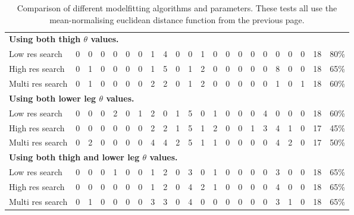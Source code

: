 \begin{landscape}
\begin{table}[p]
\begin{tabular}{|l|c@{ }c|c@{ }c|c@{ }c|c@{ }c|c@{ }c|c@{ }c|c@{ }c|c@{ }c|c@{ }c|c@{ }c|c|}
			\hline
			\multicolumn{22}{|l|}{\textbf{Using both thigh $\theta$ values.}} \\
			Low res search             & 0 & 0 & 0 & 0 & 0 & 0 & 1 & 4 & 0 & 0 & 1 & 0 & 0 & 0 & 0 & 0 & 0 & 0 & 0 & 18 & 80\% \\
			High res search            & 0 & 1 & 0 & 0 & 0 & 0 & 1 & 5 & 0 & 1 & 2 & 0 & 0 & 0 & 0 & 0 & 8 & 0 & 0 & 18 & 65\% \\
			Multi res search           & 0 & 1 & 0 & 0 & 0 & 0 & 2 & 2 & 0 & 1 & 2 & 0 & 0 & 0 & 0 & 0 & 1 & 0 & 1 & 18 & 60\% \\
			
			\hline
			\multicolumn{22}{|l|}{\textbf{Using both lower leg $\theta$ values.}} \\
			Low res search             & 0 & 0 & 0 & 2 & 0 & 1 & 2 & 0 & 1 & 5 & 0 & 1 & 0 & 0 & 0 & 4 & 0 & 0 & 0 & 18 & 60\% \\
			High res search            & 0 & 0 & 0 & 0 & 0 & 0 & 2 & 2 & 1 & 5 & 1 & 2 & 0 & 0 & 1 & 3 & 4 & 1 & 0 & 17 & 45\% \\
			Multi res search           & 0 & 2 & 0 & 0 & 0 & 0 & 4 & 4 & 2 & 5 & 1 & 1 & 0 & 0 & 0 & 0 & 4 & 2 & 0 & 17 & 50\% \\
			
			\hline
			\multicolumn{22}{|l|}{\textbf{Using both thigh and lower leg $\theta$ values.}} \\
			Low res search             & 0 & 0 & 0 & 1 & 0 & 0 & 1 & 2 & 0 & 3 & 0 & 1 & 0 & 0 & 0 & 0 & 3 & 0 & 0 & 18 & 65\% \\
			High res search            & 0 & 0 & 0 & 0 & 0 & 0 & 1 & 2 & 0 & 4 & 2 & 1 & 0 & 0 & 0 & 0 & 4 & 0 & 0 & 18 & 65\% \\
			Multi res search           & 0 & 1 & 0 & 0 & 0 & 0 & 3 & 3 & 0 & 4 & 0 & 0 & 0 & 0 & 0 & 0 & 3 & 1 & 0 & 18 & 65\% \\
			
			\hline
		\end{tabular}
		\caption{Comparison of different modelfitting algorithms and parameters.
			These tests all use the mean-normalising euclidean distance function from the previous page.}
		\label{ClassificationResults2}
	\end{table}
\end{landscape}

